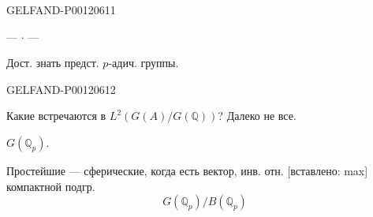 \begin{GelfandAdjacentEvidence}{GELFAND-P001206}{11}

\begin{center}--- \(\cdot\) ---\end{center}
Дост. знать предст. $p$-адич. группы.
\end{GelfandAdjacentEvidence}
\begin{GelfandAdjacentEvidence}{GELFAND-P001206}{12}


Какие встречаются в \(L^2(G(A)/G(\mathbb Q))\)? Далеко не все.

 \(G(\mathbb Q_p)\).

Простейшие --- сферические, когда есть вектор, инв. отн. [вставлено: max] компактной подгр.
\[
G(\mathbb Q_p)/B(\mathbb Q_p)
\]
\end{GelfandAdjacentEvidence}



